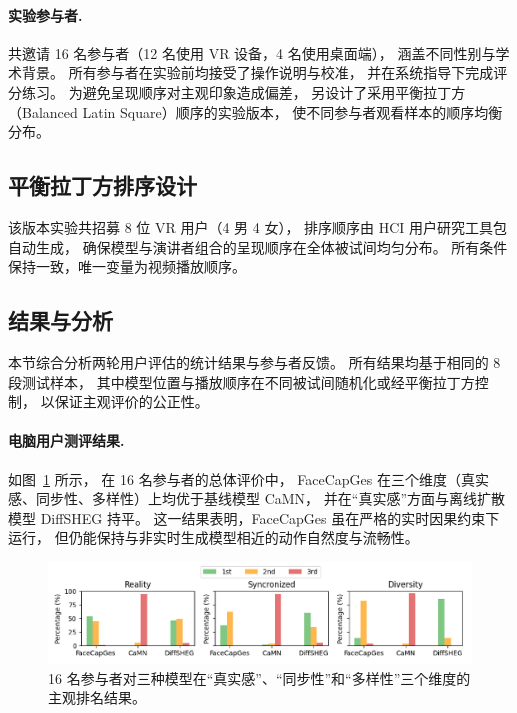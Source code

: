 \begin{table}[h]
\paragraph{实验参与者.}
共邀请 16 名参与者（12 名使用 VR 设备，4 名使用桌面端），
涵盖不同性别与学术背景。
所有参与者在实验前均接受了操作说明与校准，
并在系统指导下完成评分练习。
为避免呈现顺序对主观印象造成偏差，
另设计了采用平衡拉丁方（Balanced Latin Square）顺序的实验版本，
使不同参与者观看样本的顺序均衡分布。

\subsection{平衡拉丁方排序设计}
\label{subsec:latin_square}

该版本实验共招募 8 位 VR 用户（4 男 4 女），
排序顺序由 HCI 用户研究工具包 \cite{LatinSquareToolkit} 自动生成，
确保模型与演讲者组合的呈现顺序在全体被试间均匀分布。
所有条件保持一致，唯一变量为视频播放顺序。

\subsection{结果与分析}
\label{subsec:user_study_result}

本节综合分析两轮用户评估的统计结果与参与者反馈。
所有结果均基于相同的 8 段测试样本，
其中模型位置与播放顺序在不同被试间随机化或经平衡拉丁方控制，
以保证主观评价的公正性。

\paragraph{电脑用户测评结果.}
如图~\ref{fig:userstudy} 所示，
在 16 名参与者的总体评价中，
FaceCapGes 在三个维度（真实感、同步性、多样性）上均优于基线模型 CaMN，
并在“真实感”方面与离线扩散模型 DiffSHEG 持平。
这一结果表明，FaceCapGes 虽在严格的实时因果约束下运行，
但仍能保持与非实时生成模型相近的动作自然度与流畅性。

\begin{figure}[h!t]
\centering
\includegraphics[width=\linewidth]{figures/UserStudy_All.png}
\caption{16 名参与者对三种模型在“真实感”、“同步性”和“多样性”三个维度的主观排名结果。}
\label{fig:userstudy}
\end{figure}


\end{table}

